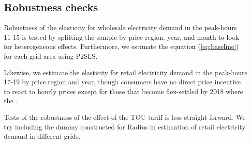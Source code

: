 \subsection{Robustness checks}
\label{subsec:e_robustness}
Robustness of the elasticity for wholesale electricity demand in the peak-hours 11-15 is tested by splitting the sample by price region, year, and month to look for heterogeneous effects. Furthermore, we estimate the equation (\ref{eq:baseline}) for each grid area using P2SLS.
\par
Likewise, we estimate the elasticity for retail electricity demand in the peak-hours 17-19 by price region and year, though consumers have no direct price incentive to react to hourly prices except for those that become flex-settled by 2018 where the .
\bigskip\par
Tests of the robustness of the effect of the TOU tariff is less straight forward. We try including the dummy constructed for Radius in estimation of retail electricity demand in different grids.
